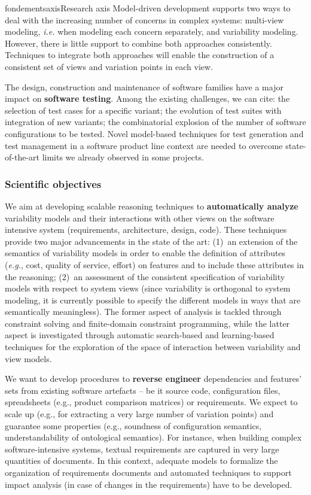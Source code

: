 \documentclass{ra2018}
\begin{document}
\begin{module}{fondements}{axis}{Research axis}
Model-driven development supports two ways to deal with the increasing number of concerns in complex systems: multi-view modeling, \textit{i.e.} when modeling each concern separately, and variability modeling. However, there is little support to combine both approaches consistently. Techniques to integrate both approaches will enable the construction of a consistent set of views and variation points in each view.

The design, construction and maintenance of software families have a major impact on \textbf{software testing}. Among the existing challenges, we can cite: the selection of test cases for a specific variant; the evolution of test suites with integration of new variants; the combinatorial explosion of the number of software configurations to be tested. Novel model-based techniques for test generation and test management in a software product line context are needed to overcome state-of-the-art limits we already observed in some projects.

\subsubsection*{Scientific objectives} 


We aim at developing scalable reasoning techniques to \textbf{automatically analyze} variability models and their interactions with other views on the software intensive system (requirements, architecture, design, code). These techniques  provide two major advancements in the  state of the art: (1)~an extension of the semantics of variability models in order to enable the definition of attributes (\textit{e.g.}, cost, quality of service, effort) on features and to include these attributes in the reasoning;  (2)~an assessment of the consistent specification of variability models with respect to system views (since variability is orthogonal to system modeling, it is currently possible to specify the different models in ways that are semantically meaningless). The former aspect of analysis is tackled through  constraint solving and finite-domain constraint programming, while the latter aspect is investigated through automatic search-based and learning-based techniques for the exploration of the space of interaction between variability and view models.

We want to develop procedures to \textbf{reverse engineer} dependencies and features' sets from existing software artefacts -- be it source code, configuration files, spreadsheets (e.g., product comparison matrices) or requirements. 
We expect to scale up (e.g., for extracting a very large number of variation points) and guarantee some properties (e.g., soundness of configuration semantics, understandability of ontological semantics). 
For instance, when building complex software-intensive systems, textual requirements are captured in very large quantities of documents. In this context, adequate models to formalize the organization of requirements documents and automated techniques to support impact analysis (in case of changes in the requirements) have to be developed.


\end{module}
\end{document}
